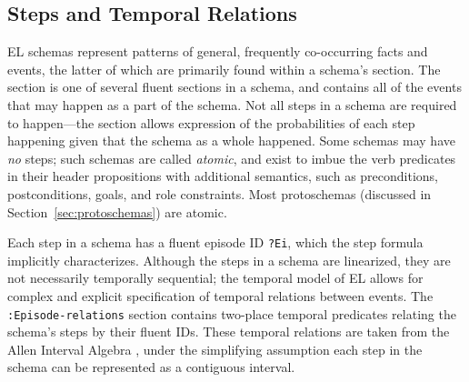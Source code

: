 \subsection{Steps and Temporal Relations}
\label{sec:steps}
EL schemas represent patterns of general, frequently co-occurring facts and events, the latter of which are primarily found within a schema's  section.
The  section is one of several fluent sections in a schema, and contains all of the events that may happen as a part of the schema.
Not all steps in a schema are required to happen---the  section allows expression of the probabilities of each step happening given that the schema as a whole happened.
Some schemas may have \textit{no} steps; such schemas are called \textit{atomic}, and exist to imbue the verb predicates in their header propositions with additional semantics, such as preconditions, postconditions, goals, and role constraints.
Most protoschemas (discussed in Section~\ref{sec:protoschemas}) are atomic.

Each step in a schema has a fluent episode ID \texttt{?Ei}, which the step formula implicitly characterizes.
Although the steps in a schema are linearized, they are not necessarily temporally sequential; the temporal model of EL allows for complex and explicit specification of temporal relations between events.
The \texttt{:Episode-relations} section contains two-place temporal predicates relating the schema's steps by their fluent IDs.
These temporal relations are taken from the Allen Interval Algebra \citep{allen1983maintaining}, under the simplifying assumption each step in the schema can be represented as a contiguous interval.


